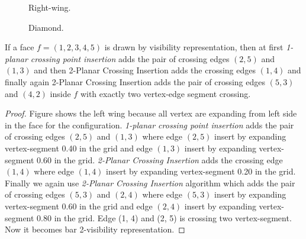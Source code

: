 \begin{figure}[!tb]
\centering
\resizebox{150mm}{!}{}
\caption{Right-wing.}
\label{fig:rightwing}
\end{figure}

\begin{figure}[!tb]
\centering
\resizebox{150mm}{!}{}
\caption{Diamond.}
\label{fig:diamondstep}
\end{figure}








\begin{lemma}
If a face $f = (1,2,3,4,5)$ is drawn by visibility representation, then at first \emph{1-planar crossing point insertion} adds the pair of crossing edges $(2, 5)$ and $(1, 3)$ and then {2-Planar Crossing Insertion} adds the crossing edges $(1, 4)$ and finally again {2-Planar Crossing Insertion} adds the pair of crossing edges $(5, 3)$ and $(4, 2)$ inside
$f$ with exactly two vertex-edge segment crossing.
\end{lemma}

\begin{proof}
Figure shows the left wing because all vertex are expanding from left side in the face for the configuration. \emph{1-planar crossing point insertion} adds the pair of crossing edges $(2, 5)$ and $(1, 3)$ where edge $(2, 5)$ insert by expanding vertex-segment 0.40 in the grid and edge $(1, 3)$ insert by expanding vertex-segment 0.60 in the grid. \emph{2-Planar Crossing Insertion} adds the crossing edge $(1, 4)$ where edge $(1, 4)$ insert by expanding vertex-segment 0.20 in the grid. Finally we again use \emph{2-Planar Crossing Insertion} algorithm which adds the pair of crossing edges $(5, 3)$ and $(2, 4)$ where edge $(5, 3)$ insert by expanding vertex-segment 0.60 in the grid and edge $(2, 4)$ insert by expanding vertex-segment 0.80 in the grid. Edge (1, 4) and (2, 5) is crossing two vertex-segment. Now it becomes bar 2-visibility representation.
\end{proof}

